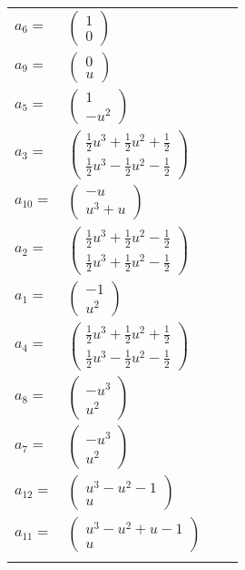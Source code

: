 \documentclass[1p]{elsarticle_modified}
\theoremstyle{definition}
\begin{document}
\begin{tabular}{m{7pt} m{180pt} m{7pt} m{180pt} }
\flushright $a_{6}=$&$\begin{pmatrix}1\\0\end{pmatrix}$ \\
\flushright $a_{9}=$&$\begin{pmatrix}0\\u\end{pmatrix}$ \\
\flushright $a_{5}=$&$\begin{pmatrix}1\\- u^2\end{pmatrix}$ \\
\flushright $a_{3}=$&$\begin{pmatrix}\frac{1}{2} u^3+\frac{1}{2} u^2+\frac{1}{2}\\\frac{1}{2} u^3-\frac{1}{2} u^2-\frac{1}{2}\end{pmatrix}$ \\
\flushright $a_{10}=$&$\begin{pmatrix}- u\\u^3+u\end{pmatrix}$ \\
\flushright $a_{2}=$&$\begin{pmatrix}\frac{1}{2} u^3+\frac{1}{2} u^2-\frac{1}{2}\\\frac{1}{2} u^3+\frac{1}{2} u^2-\frac{1}{2}\end{pmatrix}$ \\
\flushright $a_{1}=$&$\begin{pmatrix}-1\\u^2\end{pmatrix}$ \\
\flushright $a_{4}=$&$\begin{pmatrix}\frac{1}{2} u^3+\frac{1}{2} u^2+\frac{1}{2}\\\frac{1}{2} u^3-\frac{1}{2} u^2-\frac{1}{2}\end{pmatrix}$ \\
\flushright $a_{8}=$&$\begin{pmatrix}- u^3\\u^2\end{pmatrix}$ \\
\flushright $a_{7}=$&$\begin{pmatrix}- u^3\\u^2\end{pmatrix}$ \\
\flushright $a_{12}=$&$\begin{pmatrix}u^3- u^2-1\\u\end{pmatrix}$ \\
\flushright $a_{11}=$&$\begin{pmatrix}u^3- u^2+u-1\\u\end{pmatrix}$\\&\end{tabular}
\end{document}
